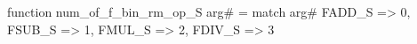 function num_of_f_bin_rm_op_S arg# = match arg# {
  FADD_S => 0,
  FSUB_S => 1,
  FMUL_S => 2,
  FDIV_S => 3
}
